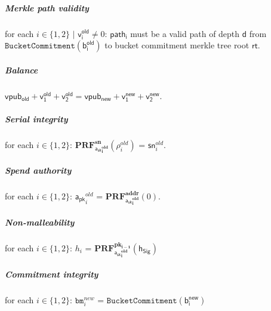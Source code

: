 \documentclass[8pt]{article}
\newcommand{\SpendAuthorityPublic}{\mathsf{a_{pk}}}
\newcommand{\SpendAuthorityPrivate}{\mathsf{a_{sk}}}
\newcommand{\BucketAddressRand}{\mathsf{\rho}}
\newcommand{\PRF}[2]{\mathbf{PRF_{#1}^{#2}}}
\newcommand{\PRFaddr}[1]{\PRF{#1}{addr}}
\newcommand{\PRFsn}[1]{\PRF{#1}{sn}}
\newcommand{\PRFpk}[2]{\PRF{#1}{pk_{#2}}}
\newcommand{\bm}{\mathbf{\mathtt{bm}}}
\newcommand{\MerkleDepth}{\mathsf{d}}
\newcommand{\sn}{\mathsf{sn}}
\newcommand{\rt}{\mathsf{rt}}
\newcommand{\hSig}{\mathsf{h_{Sig}}}
\newcommand{\vpubold}{\mathsf{vpub_{old}}}
\newcommand{\vpubnew}{\mathsf{vpub_{new}}}
\newcommand{\bOld}[1]{\mathsf{b_{#1}^{old}}}
\newcommand{\bNew}[1]{\mathsf{b_{#1}^{new}}}
\newcommand{\vOld}[1]{\mathsf{v_{#1}^{old}}}
\newcommand{\vNew}[1]{\mathsf{v_{#1}^{new}}}
\newcommand{\path}[1]{\mathsf{path_{#1}}}
\newcommand{\BucketCommitment}[1]{\mathtt{BucketCommitment(#1)}}
\begin{document}
\subparagraph{Merkle path validity}

for each $i \in \{1, 2\}$ $\mid$ $\vOld{i} \neq 0$: $\path{i}$ must be a valid path of depth $\MerkleDepth$ from \linebreak $\BucketCommitment{\bOld{i}}$ to bucket commitment merkle tree root $\rt$.

\subparagraph{Balance}

$\vpubold + \vOld{1} + \vOld{2} = \vpubnew + \vNew{1} + \vNew{2}$.

\subparagraph{Serial integrity}

for each $i \in \{1, 2\}$: $\PRFsn{\SpendAuthorityPrivate^{old}_{i}}(\BucketAddressRand^{old}_{i})$ = $\sn^{old}_{i}$.

\subparagraph{Spend authority}

for each $i \in \{1, 2\}$: $\SpendAuthorityPublic^{old}_{i}$ = $\PRFaddr{\SpendAuthorityPrivate^{old}_{i}}(0)$.

\subparagraph{Non-malleability}

for each $i \in \{1, 2\}$: $h_i$ = $\PRFpk{\SpendAuthorityPrivate^{old}_i}{i-1}(\hSig)$

\subparagraph{Commitment integrity}

for each $i \in \{1, 2\}$: $\bm^{new}_i$ = $\BucketCommitment{\bNew{i}}$
\end{document}
